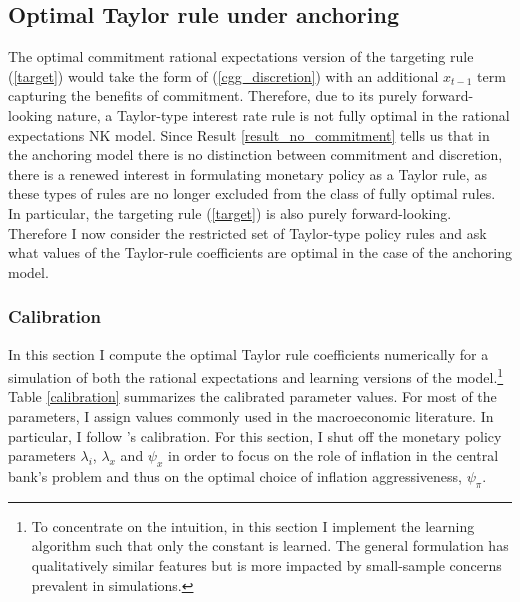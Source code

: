 \documentclass[11pt]{article}
\renewcommand{\[}{\begin{equation}}
\renewcommand{\]}{\end{equation}}
\begin{document}
\subsection{Optimal Taylor rule under anchoring}\label{opt_TR}
The optimal commitment rational expectations version of the targeting rule (\ref{target}) would take the form of (\ref{cgg_discretion}) with an additional $x_{t-1}$ term capturing the benefits of commitment. Therefore, due to its purely forward-looking nature, a Taylor-type interest rate rule is not fully optimal in the rational expectations NK model. Since Result \ref{result_no_commitment} tells us that in the anchoring model there is no distinction between commitment and discretion, there is a renewed interest in formulating monetary policy as a Taylor rule, as these types of rules are no longer excluded from the class of fully optimal rules. In particular, the targeting rule (\ref{target}) is also purely forward-looking. Therefore I now consider the restricted set of Taylor-type policy rules and ask what values of the Taylor-rule coefficients are optimal in the case of the anchoring model.

\subsubsection{Calibration}

In this section I compute the optimal Taylor rule coefficients numerically for a simulation of both the rational expectations and learning versions of the model.\footnote{To concentrate on the intuition, in this section I implement the learning algorithm such that only the constant is learned. The general formulation has qualitatively similar features but is more impacted by small-sample concerns prevalent in simulations.} Table \ref{calibration} summarizes the calibrated parameter values. For most of the parameters, I assign values commonly used in the macroeconomic literature. In particular, I follow \cite{woodford2011interest}'s calibration. For this section, I shut off the monetary policy parameters $\lambda_i$, $\lambda_x$ and $\psi_x$ in order to focus on the role of inflation in the central bank's problem and thus on the optimal choice of inflation aggressiveness, $\psi_{\pi}$.
\end{document}
